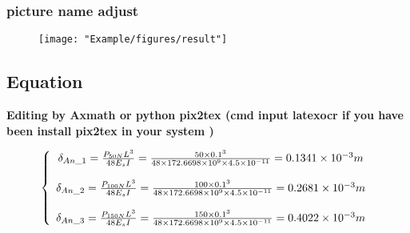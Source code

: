 \subsubsection{picture name adjust}
\begin{figure}[H]
	\centering
	\texttt{[image: "Example/figures/result"]}
	\caption*{}
	\label{T 2.1}
\end{figure}
\newpage

\subsection{Equation}
\textbf{Editing by Axmath or python pix2tex (cmd input latexocr if you have been install pix2tex in your system )}

\begin{Large}
	\begin{equation}
		\label{E 2.1}
		\left\{ \begin{array}{c}
			\delta _{An\_1}=\frac{P_{50N}L^3}{48E_sI}=\frac{50\times 0.1^3}{48\times 172.6698\times 10^9\times 4.5\times 10^{-11}}=0.1341\times 10^{-3}m\\
			\\
			\delta _{An\_2}=\frac{P_{100N}L^3}{48E_sI}=\frac{100\times 0.1^3}{48\times 172.6698\times 10^9\times 4.5\times 10^{-11}}=0.2681\times 10^{-3}m\\
			\\
			\delta _{An\_3}=\frac{P_{150N}L^3}{48E_sI}=\frac{150\times 0.1^3}{48\times 172.6698\times 10^9\times 4.5\times 10^{-11}}=0.4022\times 10^{-3}m\\
		\end{array} \right. 
		\\
	\end{equation}
\end{Large}



\FloatBarrier %



